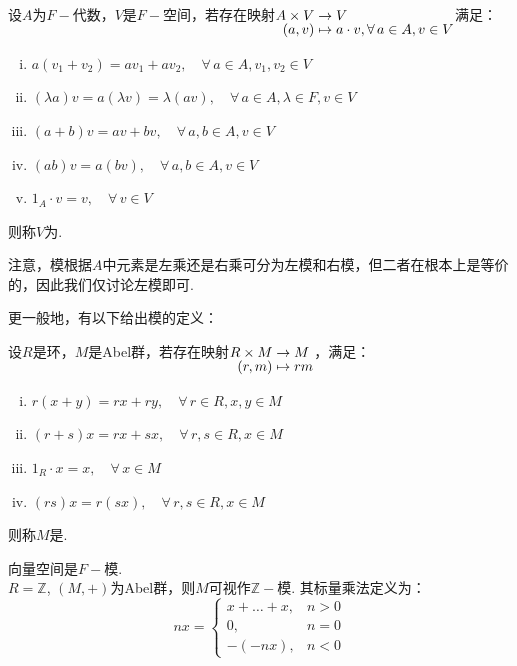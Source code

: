 \begin{definition}[左$A-\!\!$模]
    设$A$为$F-\!\!$代数，$V$是$F-\!\!$空间，若存在映射$\setjot[-2]\begin{aligned}[t]
        A \times V &\to V \\
        (a,v) &\mapsto a \cdot v,\forall\, a \in A, v \in V
    \end{aligned}$满足：
    \begin{enumerate}[(i)]
        \item $a(v_1 + v_2) = a v_1 + a v_2, \quad\forall\, a \in A, v_1, v_2 \in V$
        \item $(\lambda a) v = a (\lambda v) = \lambda (av), \quad\forall\, a \in A, \lambda \in F, v \in V$
        \item $(a+b) v = av + bv, \quad\forall\, a, b \in A, v \in V$
        \item $(ab)v = a(bv), \quad\forall\, a, b \in A, v \in V$
        \item $1_A \cdot v = v, \quad\forall\, v \in V$
    \end{enumerate}
    则称$V$为.
\end{definition}

注意，模根据$A$中元素是左乘还是右乘可分为左模和右模，但二者在根本上是等价的，因此我们仅讨论左模即可.\par
更一般地，有以下给出模的定义：
\begin{definition}[模]
    设$R$是环，$M$是Abel群，若存在映射$\setjot[-2]\begin{aligned}[t]
        R \times M &\to M \\
        (r, m) &\mapsto rm
    \end{aligned}$，满足：
    \begin{enumerate}[(i)]
        \item $r(x+y) = rx+ry, \quad\forall\, r \in R, x, y \in M$
        \item $(r+s)x = rx+sx, \quad\forall\, r, s \in R, x \in M$
        \item $1_R \cdot x = x, \quad\forall\, x \in M$
        \item $(rs)x = r(sx), \quad\forall\, r, s \in R, x \in M$
    \end{enumerate}
    则称$M$是.
\end{definition}

\begin{instance}
    向量空间是$F-\!\!$模. \\
    $R=\mathbb{Z}$, $(M, +)$为Abel群，则$M$可视作$\mathbb{Z}-\!\!$模.
    其标量乘法定义为：
    \[ nx = \begin{cases} x + \dots + x, & n > 0 \\ 0, & n = 0 \\ -(-nx), & n < 0 \end{cases} \]
\end{instance}

